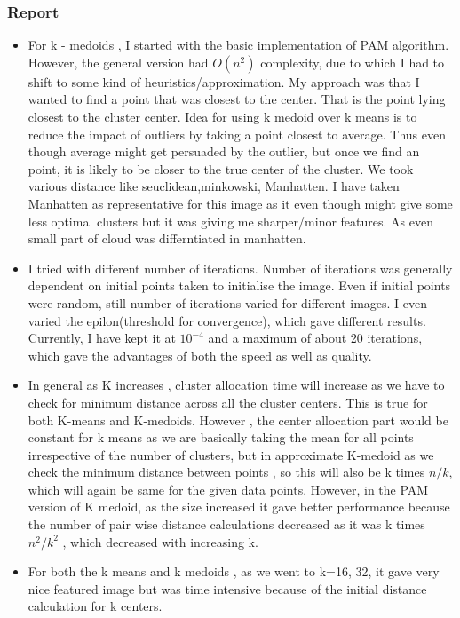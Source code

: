 \documentclass[twoside,10pt]{article}
\begin{document}
\subsubsection*{Report}
\begin{itemize}
  \item
For k - medoids , I started with the basic implementation of PAM algorithm. However, the general version had  $O(n^2)$ complexity, due to which I had to shift to some kind of heuristics/approximation. My approach was that I wanted to find a point that was  closest to the center. That is the point lying closest to the cluster center. Idea  for using k medoid over k means is to reduce the impact of outliers by taking a point closest to average. Thus even though average might get persuaded by the outlier, but  once we find an point, it is likely to be closer to the true center of the cluster. We took various distance like seuclidean,minkowski, Manhatten. I have taken Manhatten as representative for this image as it even though might give some less optimal clusters but it was giving me sharper/minor features. As even small part of cloud was differntiated in manhatten.
\item
I tried with different number of iterations. Number of iterations was generally dependent on initial points taken to initialise the image. Even if initial points were random, still number of iterations varied for different images. I even varied the epilon(threshold for convergence), which gave different results. Currently, I have kept it at $10^{-4}$ and a maximum of about 20 iterations,  which gave the advantages of both the speed as well as quality.
  \item
In general as K increases , cluster allocation time will increase as we have to check for minimum distance across all the cluster centers. This is true for both K-means and K-medoids. However , the center allocation part would be constant for k means as we are basically taking the mean for all points irrespective of the number of clusters, but in approximate K-medoid as we check the minimum distance between points , so this will also be k times $n/k$, which will again be same for the given data points. However, in the PAM version of K medoid, as the size increased it gave better performance because the number of pair wise distance calculations decreased as it was k times $n^2 /k^2$ , which decreased with increasing k.
\item For both the k means and k medoids , as we went to k=16, 32, it gave very nice featured image but was time intensive because of the initial distance calculation for k centers.

\end{itemize}
\end{document}
